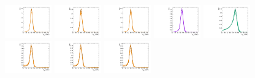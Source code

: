 \begin{figure}[htbp]
  \centering
  \includegraphics[width=0.18\textwidth]{fig/2Dfit/templateSignalVsMX_fromDC_GbuToWW_MJJ_mu_HP_nobb_LDy.pdf}
  \includegraphics[width=0.18\textwidth]{fig/2Dfit/templateSignalVsMX_fromDC_RadToWW_MJJ_mu_HP_nobb_LDy.pdf}
  \includegraphics[width=0.18\textwidth]{fig/2Dfit/templateSignalVsMX_fromDC_ZprToWW_MJJ_mu_HP_nobb_LDy.pdf}
  \includegraphics[width=0.18\textwidth]{fig/2Dfit/templateSignalVsMX_fromDC_WprToWZ_MJJ_mu_HP_nobb_LDy.pdf}
  \includegraphics[width=0.18\textwidth]{fig/2Dfit/templateSignalVsMX_fromDC_WprToWH_MJJ_mu_HP_nobb_LDy.pdf}\\
  \includegraphics[width=0.18\textwidth]{fig/2Dfit/templateSignalVsMX_fromDC_GbuToWW_MJJ_mu_LP_nobb_LDy.pdf}
  \includegraphics[width=0.18\textwidth]{fig/2Dfit/templateSignalVsMX_fromDC_RadToWW_MJJ_mu_LP_nobb_LDy.pdf}
  \includegraphics[width=0.18\textwidth]{fig/2Dfit/templateSignalVsMX_fromDC_ZprToWW_MJJ_mu_LP_nobb_LDy.pdf}

\end{figure}
